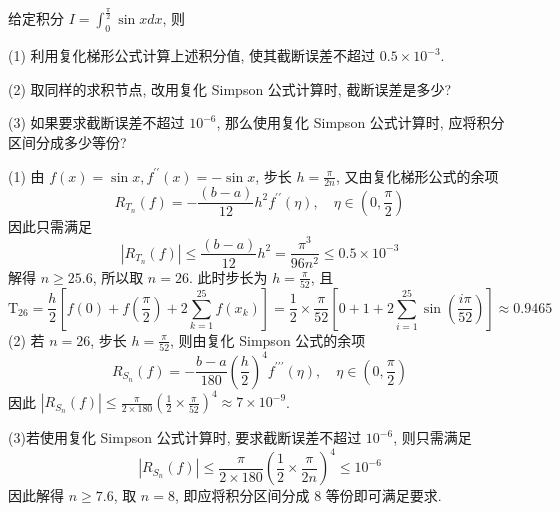  \begin{tcolorbox}[enhanced,colback=10,colframe=9,breakable,coltitle=green!25!black,title=2024]
 给定积分 $ I=\displaystyle\int_{0}^{\frac{\pi}{2}} \sin x d x $, 则
 
(1) 利用复化梯形公式计算上述积分值, 使其截断误差不超过 $ 0.5 \times 10^{-3} $.

(2) 取同样的求积节点, 改用复化 Simpson 公式计算时, 截断误差是多少?

(3) 如果要求截断误差不超过 $ 10^{-6} $, 那么使用复化 Simpson 公式计算时, 应将积分区间分成多少等份?
\tcblower


(1) 由 $ f(x)=\sin x, f^{\prime \prime}(x)=-\sin x $, 步长 $ h=\frac{\pi}{2 n} $, 又由复化梯形公式的余项
$$
R_{T_{n}}(f)=-\frac{(b-a)}{12} h^{2} f^{\prime \prime}(\eta), \quad \eta \in\left(0, \frac{\pi}{2}\right)
$$
因此只需满足
$$
\left|R_{T_{n}}(f)\right| \leqslant \frac{(b-a)}{12} h^{2}=\frac{\pi^{3}}{96 n^{2}} \leqslant 0.5 \times 10^{-3}
$$
解得 $ n \geqslant 25.6 $, 所以取 $ n=26 $. 此时步长为 $ h=\frac{\pi}{52} $, 且
$$
\mathrm{T}_{26}=\frac{h}{2}\left[f(0)+f\left(\frac{\pi}{2}\right)+2 \sum_{k=1}^{25} f\left(x_{k}\right)\right]=\frac{1}{2} \times \frac{\pi}{52}\left[0+1+2 \sum_{i=1}^{25} \sin \left(\frac{i \pi}{52}\right)\right] \approx 0.9465
$$
(2) 若 $ n=26 $, 步长 $ h=\frac{\pi}{52} $, 则由复化 Simpson 公式的余项
$$
R_{S_{n}}(f)=-\frac{b-a}{180}\left(\frac{h}{2}\right)^{4} f^{\prime \prime \prime}(\eta), \quad \eta \in\left(0, \frac{\pi}{2}\right)
$$
因此 $ \left|R_{S_{n}}(f)\right| \leqslant \frac{\pi}{2 \times 180}\left(\frac{1}{2} \times \frac{\pi}{52}\right)^{4} \approx 7 \times 10^{-9} $.

(3)若使用复化 Simpson 公式计算时, 要求截断误差不超过 $ 10^{-6} $, 则只需满足
$$
\left|R_{S_{n}}(f)\right| \leqslant \frac{\pi}{2 \times 180}\left(\frac{1}{2} \times \frac{\pi}{2 n}\right)^{4} \leqslant 10^{-6}
$$
因此解得 $ n \geqslant 7.6 $, 取 $ n=8 $, 即应将积分区间分成 8 等份即可满足要求.
\end{tcolorbox}

